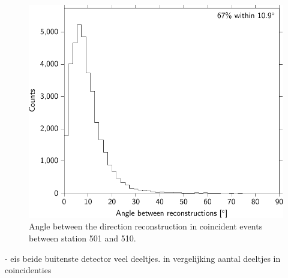\begin{figure}
    \centering
    \includegraphics{plots/station/angle_between_501_510_minn2}
    \caption{Angle between the direction reconstruction in coincident events between station 501 and 510.}
    \label{fig:angle_between_501_510}
\end{figure}



- eis beide buitenste detector veel deeltjes. in vergelijking aantal deeltjes in coincidenties
